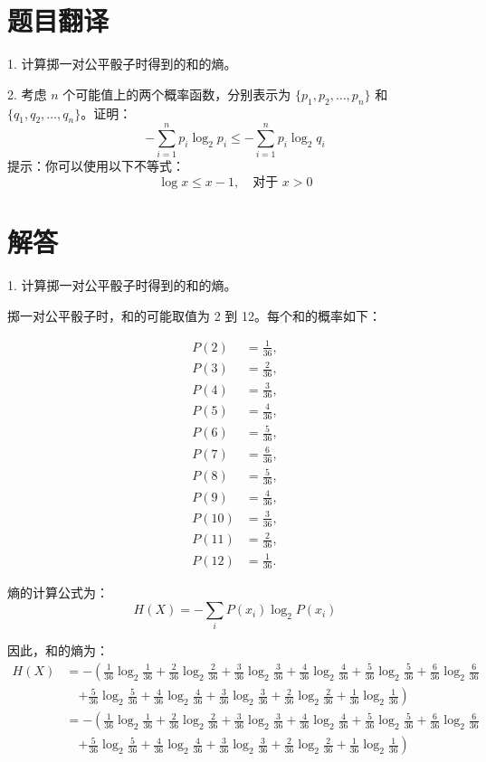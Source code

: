 \documentclass[UTF8]{report}
\theoremstyle{MyLineTheoremStyle} %
\theoremstyle{MyBlockTheoremStyle} %
\theoremstyle{MySubsubsectionStyle} %
\begin{document}
\section*{题目翻译}

1. 计算掷一对公平骰子时得到的和的熵。

2. 考虑 \(n\) 个可能值上的两个概率函数，分别表示为 \(\{p_1, p_2, \ldots, p_n\}\) 和 \(\{q_1, q_2, \ldots, q_n\}\)。证明：
\[
-\sum_{i=1}^{n} p_i \log_2 p_i \leq -\sum_{i=1}^{n} p_i \log_2 q_i
\]
提示：你可以使用以下不等式：
\[
\log x \leq x - 1, \quad \text{对于 } x > 0
\]

\section*{解答}

1. 计算掷一对公平骰子时得到的和的熵。

掷一对公平骰子时，和的可能取值为 2 到 12。每个和的概率如下：

\[
\begin{aligned}
    P(2) &= \frac{1}{36}, \\
    P(3) &= \frac{2}{36}, \\
    P(4) &= \frac{3}{36}, \\
    P(5) &= \frac{4}{36}, \\
    P(6) &= \frac{5}{36}, \\
    P(7) &= \frac{6}{36}, \\
    P(8) &= \frac{5}{36}, \\
    P(9) &= \frac{4}{36}, \\
    P(10) &= \frac{3}{36}, \\
    P(11) &= \frac{2}{36}, \\
    P(12) &= \frac{1}{36}.
\end{aligned}
\]

熵的计算公式为：
\[
H(X) = -\sum_{i} P(x_i) \log_2 P(x_i)
\]

因此，和的熵为：
\[
\begin{aligned}
    H(X) &= -\left( \frac{1}{36} \log_2 \frac{1}{36} + \frac{2}{36} \log_2 \frac{2}{36} + \frac{3}{36} \log_2 \frac{3}{36} + \frac{4}{36} \log_2 \frac{4}{36} + \frac{5}{36} \log_2 \frac{5}{36} + \frac{6}{36} \log_2 \frac{6}{36} \right. \\
    &\quad \left. + \frac{5}{36} \log_2 \frac{5}{36} + \frac{4}{36} \log_2 \frac{4}{36} + \frac{3}{36} \log_2 \frac{3}{36} + \frac{2}{36} \log_2 \frac{2}{36} + \frac{1}{36} \log_2 \frac{1}{36} \right) \\
    &= -\left( \frac{1}{36} \log_2 \frac{1}{36} + \frac{2}{36} \log_2 \frac{2}{36} + \frac{3}{36} \log_2 \frac{3}{36} + \frac{4}{36} \log_2 \frac{4}{36} + \frac{5}{36} \log_2 \frac{5}{36} + \frac{6}{36} \log_2 \frac{6}{36} \right. \\
    &\quad \left. + \frac{5}{36} \log_2 \frac{5}{36} + \frac{4}{36} \log_2 \frac{4}{36} + \frac{3}{36} \log_2 \frac{3}{36} + \frac{2}{36} \log_2 \frac{2}{36} + \frac{1}{36} \log_2 \frac{1}{36} \right)
\end{aligned}
\]
\end{document}
